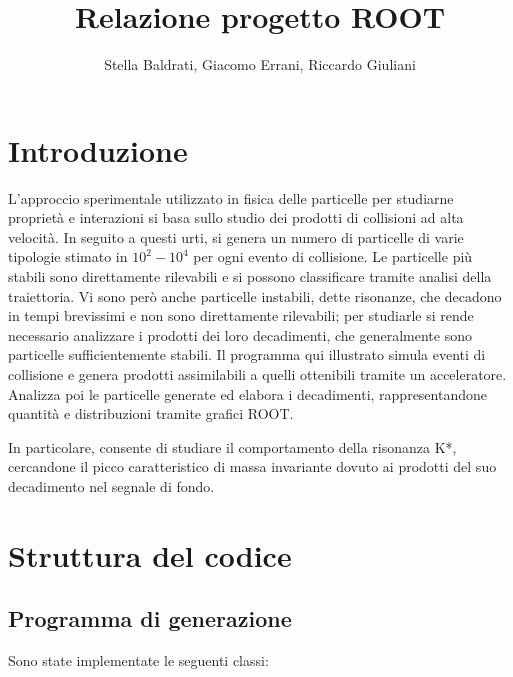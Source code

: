 \documentclass[12pt, a4paper]{article}
\title{Relazione progetto ROOT} %
\date{}
\author{Stella Baldrati, Giacomo Errani, Riccardo Giuliani}
\begin{document}
\maketitle

\section{Introduzione}

L'approccio sperimentale utilizzato in fisica delle particelle per studiarne proprietà e interazioni si basa sullo studio dei prodotti di collisioni ad alta velocità. In seguito a questi urti, si genera un numero di particelle di varie tipologie stimato in $10^2-10^4$ per ogni evento di collisione. 
\newline
Le particelle più stabili sono direttamente rilevabili e si possono classificare tramite analisi della traiettoria. Vi sono però anche particelle instabili, dette risonanze, che decadono in tempi brevissimi e non sono direttamente rilevabili; per studiarle si rende necessario analizzare i prodotti dei loro decadimenti, che generalmente sono particelle sufficientemente stabili.
\newline
Il programma qui illustrato simula eventi di collisione e genera prodotti assimilabili a quelli ottenibili tramite un acceleratore. Analizza poi le particelle generate ed elabora i decadimenti, rappresentandone quantità e distribuzioni tramite grafici ROOT. 

In particolare, consente di studiare il comportamento della risonanza K*, cercandone il picco caratteristico di massa invariante dovuto ai prodotti del suo decadimento nel segnale di fondo.

\section{Struttura del codice}

\subsection{Programma di generazione}

Sono state implementate le seguenti classi:
\end{document}

